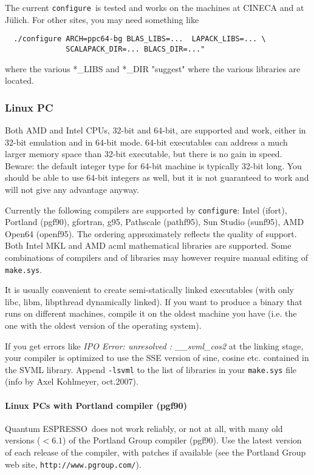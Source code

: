 \documentclass[12pt,a4paper]{article}
\def\qe{{\sc Quantum ESPRESSO}}
\def\configure{\texttt{configure}}
\begin{document}
The current \configure\ is tested and works on the machines at CINECA 
and at J\"ulich. For other sites, you may need something like
\begin{verbatim}
  ./configure ARCH=ppc64-bg BLAS_LIBS=...  LAPACK_LIBS=... \
              SCALAPACK_DIR=... BLACS_DIR=..."
\end{verbatim}
where the various *\_LIBS and *\_DIR "suggest" where the various libraries 
are located.

\subsubsection{Linux PC}

Both AMD and Intel CPUs, 32-bit and 64-bit, are supported and work,
either in 32-bit emulation and in 64-bit mode. 64-bit executables 
can address a much larger memory space than 32-bit executable, but
there is no gain in speed.
Beware: the default integer type for 64-bit machine is typically
32-bit long. You should be able to use 64-bit integers as well, 
but it is not guaranteed to work and will not give 
any advantage anyway.

Currently the following compilers are supported by \configure:
Intel (ifort), Portland (pgf90), gfortran, g95, Pathscale (pathf95), 
Sun Studio (sunf95),  AMD Open64 (openf95). The ordering approximately
reflects the quality of support. Both Intel MKL and AMD acml mathematical
libraries are supported. Some combinations of compilers and of libraries
may however require manual editing of \texttt{make.sys}.

It is usually convenient to create semi-statically linked executables (with only
libc, libm, libpthread dynamically linked). If you want to produce a binary
that runs on different machines, compile it on the oldest machine you have
(i.e. the one with the oldest version of the operating system).

If you get errors like {\em IPO Error: unresolved : \_\_svml\_cos2}
at the linking stage, your compiler is optimized to use the SSE
version of sine, cosine etc. contained in the SVML library. Append
\texttt{-lsvml} to the list of libraries in your \texttt{make.sys} file (info by Axel
Kohlmeyer, oct.2007). 

\paragraph{Linux PCs with Portland compiler (pgf90)}

\qe\ does not work reliably, or not at all, with many old
versions ($< 6.1$) of the Portland Group compiler (pgf90).
 Use the latest version of each 
release of the compiler, with patches if available (see
the Portland Group web site, \texttt{http://www.pgroup.com/}).
\end{document}
